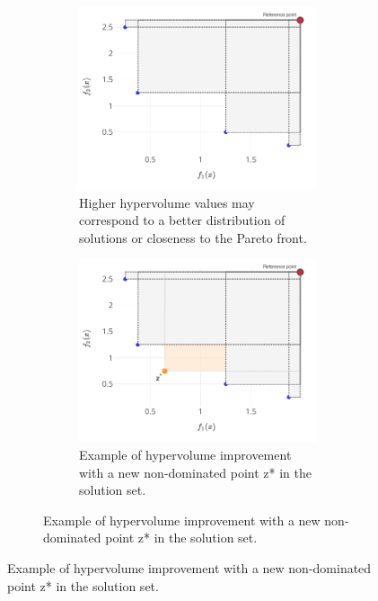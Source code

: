            \begin{figure}
                \centering
                \begin{subfigure}{\textwidth}
                    \begin{subfigure}{0.45\textwidth}
                        \includegraphics[width=\textwidth]{content/images/utility/hypervolume}
                        \caption{Higher hypervolume values may correspond to a better distribution of solutions or closeness to the Pareto front.}
                        \label{fig:hypervolume_basic}
                    \end{subfigure} 
                    \begin{subfigure}{0.45\textwidth}
                        \includegraphics[width=\textwidth]{content/images/utility/hypervolume_impr}
                        \caption{Example of hypervolume improvement with a new non-dominated point z* in the solution set.}
                        \label{fig:hypervolume_impr}
                    \end{subfigure} 
                \end{subfigure} 


\end{figure}
